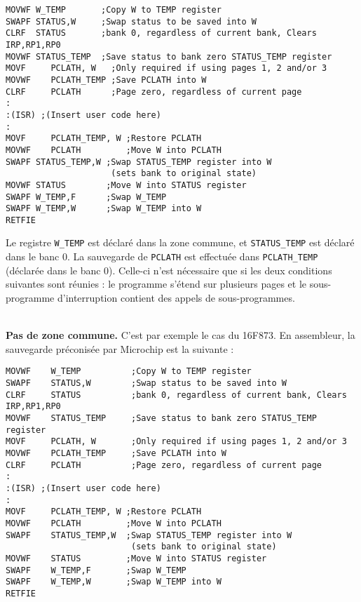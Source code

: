 \begin{lstlisting}[language=assembleur]
MOVWF W_TEMP       ;Copy W to TEMP register 
SWAPF STATUS,W     ;Swap status to be saved into W 
CLRF  STATUS       ;bank 0, regardless of current bank, Clears IRP,RP1,RP0 
MOVWF STATUS_TEMP  ;Save status to bank zero STATUS_TEMP register 
MOVF     PCLATH, W   ;Only required if using pages 1, 2 and/or 3 
MOVWF    PCLATH_TEMP ;Save PCLATH into W 
CLRF     PCLATH      ;Page zero, regardless of current page 
: 
:(ISR) ;(Insert user code here) 
: 
MOVF     PCLATH_TEMP, W ;Restore PCLATH 
MOVWF    PCLATH         ;Move W into PCLATH 
SWAPF STATUS_TEMP,W ;Swap STATUS_TEMP register into W
                     (sets bank to original state) 
MOVWF STATUS        ;Move W into STATUS register 
SWAPF W_TEMP,F      ;Swap W_TEMP 
SWAPF W_TEMP,W      ;Swap W_TEMP into W
RETFIE
\end{lstlisting}


Le registre \texttt{W\_TEMP} est déclaré dans la zone commune, et \texttt{STATUS\_TEMP} est déclaré dans le banc 0. La sauvegarde de \texttt{PCLATH} est effectuée dans \texttt{PCLATH\_TEMP} (déclarée dans le banc 0). Celle-ci n'est nécessaire que si les deux conditions suivantes sont réunies : le programme s’étend sur plusieurs pages et le sous-programme d’interruption contient des appels de sous-programmes.


~\\
\textbf{Pas de zone commune.} C’est par exemple le cas du 16F873. En assembleur, la sauvegarde préconisée par Microchip est la suivante :


\begin{lstlisting}[language=assembleur]
MOVWF    W_TEMP          ;Copy W to TEMP register 
SWAPF    STATUS,W        ;Swap status to be saved into W 
CLRF     STATUS          ;bank 0, regardless of current bank, Clears IRP,RP1,RP0 
MOVWF    STATUS_TEMP     ;Save status to bank zero STATUS_TEMP register 
MOVF     PCLATH, W       ;Only required if using pages 1, 2 and/or 3 
MOVWF    PCLATH_TEMP     ;Save PCLATH into W 
CLRF     PCLATH          ;Page zero, regardless of current page 
: 
:(ISR) ;(Insert user code here) 
: 
MOVF     PCLATH_TEMP, W ;Restore PCLATH 
MOVWF    PCLATH         ;Move W into PCLATH 
SWAPF    STATUS_TEMP,W  ;Swap STATUS_TEMP register into W
                         (sets bank to original state) 
MOVWF    STATUS         ;Move W into STATUS register 
SWAPF    W_TEMP,F       ;Swap W_TEMP 
SWAPF    W_TEMP,W       ;Swap W_TEMP into W
RETFIE
\end{lstlisting}

